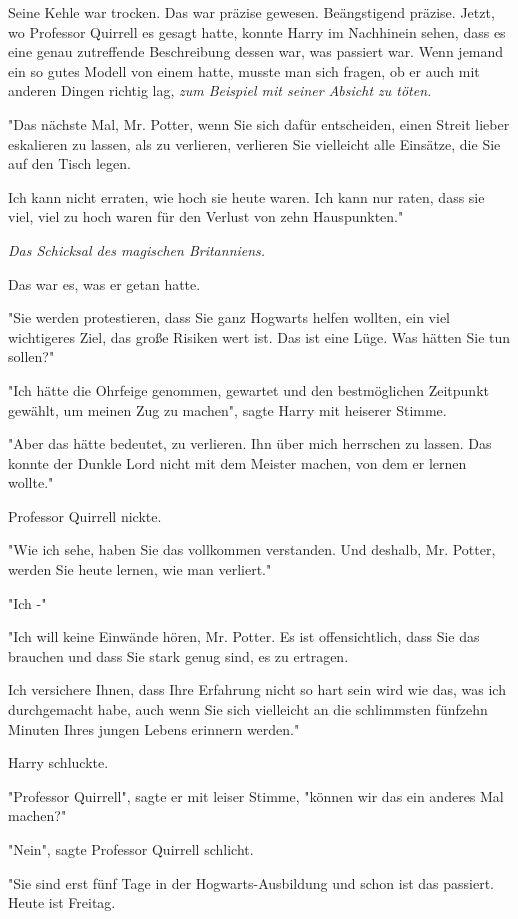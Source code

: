 {Seine Kehle war trocken. Das war präzise gewesen. Beängstigend präzise. Jetzt, wo Professor Quirrell es gesagt hatte, konnte Harry im Nachhinein sehen, dass es eine genau zutreffende Beschreibung dessen war, was passiert war. Wenn jemand ein so gutes Modell von einem hatte, musste man sich fragen, ob er auch mit anderen Dingen richtig lag, \emph{zum Beispiel mit seiner Absicht zu töten.}

"Das nächste Mal, Mr. Potter, wenn Sie sich dafür entscheiden, einen Streit lieber eskalieren zu lassen, als zu verlieren, verlieren Sie vielleicht alle Einsätze, die Sie auf den Tisch legen.

Ich kann nicht erraten, wie hoch sie heute waren. Ich kann nur raten, dass sie viel, viel zu hoch waren für den Verlust von zehn Hauspunkten."

\emph{Das Schicksal des magischen Britanniens.}

Das war es, was er getan hatte.

"Sie werden protestieren, dass Sie ganz Hogwarts helfen wollten, ein viel wichtigeres Ziel, das große Risiken wert ist. Das ist eine Lüge. Was hätten Sie tun sollen?"

"Ich hätte die Ohrfeige genommen, gewartet und den bestmöglichen Zeitpunkt gewählt, um meinen Zug zu machen", sagte Harry mit heiserer Stimme.

"Aber das hätte bedeutet, zu verlieren. Ihn über mich herrschen zu lassen. Das konnte der Dunkle Lord nicht mit dem Meister machen, von dem er lernen wollte."

Professor Quirrell nickte.

"Wie ich sehe, haben Sie das vollkommen verstanden. Und deshalb, Mr. Potter, werden Sie heute lernen, wie man verliert."

"Ich -"

"Ich will keine Einwände hören, Mr. Potter. Es ist offensichtlich, dass Sie das brauchen und dass Sie stark genug sind, es zu ertragen.

Ich versichere Ihnen, dass Ihre Erfahrung nicht so hart sein wird wie das, was ich durchgemacht habe, auch wenn Sie sich vielleicht an die schlimmsten fünfzehn Minuten Ihres jungen Lebens erinnern werden."

Harry schluckte.

"Professor Quirrell", sagte er mit leiser Stimme, "können wir das ein anderes Mal machen?"

"Nein", sagte Professor Quirrell schlicht.

"Sie sind erst fünf Tage in der Hogwarts-Ausbildung und schon ist das passiert. Heute ist Freitag.

}

